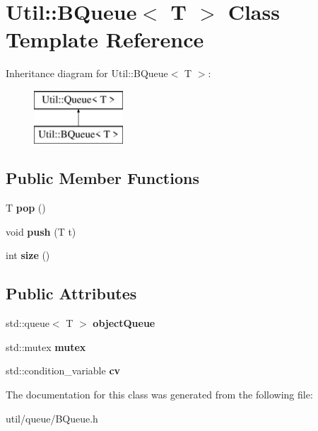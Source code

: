 \hypertarget{class_util_1_1_b_queue}{}\section{Util\+:\+:B\+Queue$<$ T $>$ Class Template Reference}
\label{class_util_1_1_b_queue}
Inheritance diagram for Util\+:\+:B\+Queue$<$ T $>$\+:\begin{figure}[H]
\begin{center}
\leavevmode
\includegraphics[height=2.000000cm]{class_util_1_1_b_queue}
\end{center}
\end{figure}
\subsection*{Public Member Functions}
\begin{DoxyCompactItemize}
\item 
\mbox{\label{class_util_1_1_b_queue_a88111ecf359f17086671177a5793c174}} 
T {\bfseries pop} ()
\item 
\mbox{\label{class_util_1_1_b_queue_a67606aeb3c886c920f932a144368f052}} 
void {\bfseries push} (T t)
\item 
\mbox{\label{class_util_1_1_b_queue_a9fd764eed02729fdb1eada4142df5dd3}} 
int {\bfseries size} ()
\end{DoxyCompactItemize}
\subsection*{Public Attributes}
\begin{DoxyCompactItemize}
\item 
\mbox{\label{class_util_1_1_b_queue_a65a8a52af6c65ccb6fa96e32dc05437c}} 
std\+::queue$<$ T $>$ {\bfseries object\+Queue}
\item 
\mbox{\label{class_util_1_1_b_queue_ae58ea571bd773a6dbcc920d087021902}} 
std\+::mutex {\bfseries mutex}
\item 
\mbox{\label{class_util_1_1_b_queue_afe3a34e631859753f7ba74627cf0c578}} 
std\+::condition\+\_\+variable {\bfseries cv}
\end{DoxyCompactItemize}


The documentation for this class was generated from the following file\+:\begin{DoxyCompactItemize}
\item 
util/queue/B\+Queue.\+h\end{DoxyCompactItemize}
